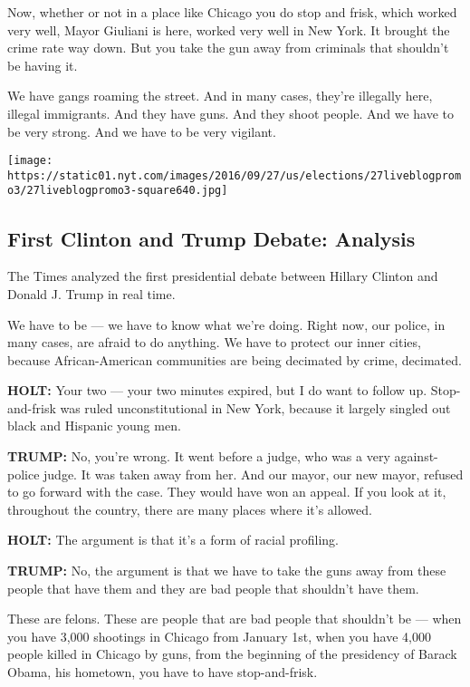 Now, whether or not in a place like Chicago you do stop and frisk, which
worked very well, Mayor Giuliani is here, worked very well in New York.
It brought the crime rate way down. But you take the gun away from
criminals that shouldn't be having it.

We have gangs roaming the street. And in many cases, they're illegally
here, illegal immigrants. And they have guns. And they shoot people. And
we have to be very strong. And we have to be very vigilant.

\href{https://www.nytimes.com/interactive/2016/09/26/us/elections/donald-trump-hillary-clinton-debate.html}{}

\texttt{[image: https://static01.nyt.com/images/2016/09/27/us/elections/27liveblogpromo3/27liveblogpromo3-square640.jpg]}

\hypertarget{first-clinton-and-trump-debate-analysis}{%
\subsection{First Clinton and Trump Debate:
Analysis}\label{first-clinton-and-trump-debate-analysis}}

The Times analyzed the first presidential debate between Hillary Clinton
and Donald J. Trump in real time.

We have to be --- we have to know what we're doing. Right now, our
police, in many cases, are afraid to do anything. We have to protect our
inner cities, because African-American communities are being decimated
by crime, decimated.

\textbf{HOLT:} Your two --- your two minutes expired, but I do want to
follow up. Stop-and-frisk was ruled unconstitutional in New York,
because it largely singled out black and Hispanic young men.

\textbf{TRUMP:} No, you're wrong. It went before a judge, who was a very
against-police judge. It was taken away from her. And our mayor, our new
mayor, refused to go forward with the case. They would have won an
appeal. If you look at it, throughout the country, there are many places
where it's allowed.

\textbf{HOLT:} The argument is that it's a form of racial profiling.

\textbf{TRUMP:} No, the argument is that we have to take the guns away
from these people that have them and they are bad people that shouldn't
have them.

These are felons. These are people that are bad people that shouldn't be
--- when you have 3,000 shootings in Chicago from January 1st, when you
have 4,000 people killed in Chicago by guns, from the beginning of the
presidency of Barack Obama, his hometown, you have to have
stop-and-frisk.

